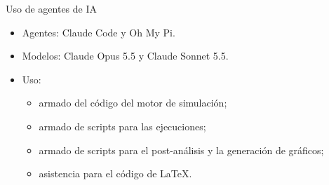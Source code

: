 \documentclass[aspectratio=169]{beamer}
\begin{document}
\begin{frame}{Uso de agentes de IA}
  \begin{itemize}\setlength{\itemsep}{1em}
    \item Agentes: Claude Code y Oh My Pi.
    \item Modelos: Claude Opus 5.5 y Claude Sonnet 5.5.
    \item Uso:
      \begin{itemize}\setlength{\itemsep}{0.4em}
        \item armado del código del motor de simulación;
        \item armado de scripts para las ejecuciones;
        \item armado de scripts para el post-análisis y la generación de gráficos;
        \item asistencia para el código de LaTeX.
      \end{itemize}
  \end{itemize}
\end{frame}
\end{document}
